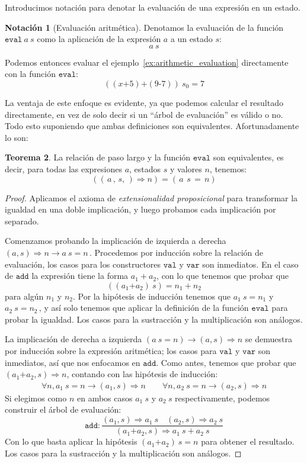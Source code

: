 \documentclass[
  a4paper, 
  10pt, 
  parskip=half, 
  toc=bibliography,
]{scrbook}
\theoremstyle{definition}
\theoremstyle{bolddef}
\newtheorem{theorem}{Teorema}[section]
\newtheorem{notation}[theorem]{Notación}
\newcommand{\funfont}[1]{\texttt{#1}}
\renewcommand{\implies}{\rightarrow}
\newcommand{\ImpPlus}{\mathbin{\texttt{+}}}
\newcommand{\ImpMinus}{\mathbin{\texttt{-}}}
\newcommand{\bigstep}{\Longrightarrow}
\begin{document}
Introducimos notación para denotar la evaluación de una expresión en un
estado.
\begin{notation}[Evaluación aritmética]
  Denotamos la evaluación de la función \(\funfont{eval} \ a \ s\) como la aplicación de la expresión \(a\)
  a un estado \(s\):
  \[
  a \ s
  \]
\end{notation}

Podemos entonces evaluar el ejemplo~\ref{ex:arithmetic_evaluation} directamente
con la función \(\funfont{eval}\):
\[
  ((x \ImpPlus 5) \ImpPlus (9 \ImpMinus 7)) \ s_0 = 7
\]

La ventaja de este enfoque es evidente, ya que podemos calcular el resultado
directamente, en vez de solo decir si un \enquote{árbol de evaluación} es válido o no.
Todo esto suponiendo que ambas definiciones son equivalentes. Afortunadamente lo son:
\begin{theorem}
  La relación de paso largo y la función \(\funfont{eval}\) son equivalentes, es decir, para todas
  las expresiones \(a\), estados \(s\) y valores \(n\), tenemos:
  \[
  ((\, a \,,\, s,\,) \bigstep n) = (\,a \, \ s \,=\, n)
  \]
\end{theorem}

\begin{proof}
Aplicamos el axioma de \emph{extensionalidad proposicional} para transformar la
igualdad en una doble implicación, y luego probamos cada implicación por separado.

Comenzamos probando la implicación de izquierda a derecha
\((a, s) \bigstep n \implies a \ s = n\, \). Procedemos por inducción
sobre la relación de evaluación, los casos para los constructores \(\funfont{val}\)
y \(\funfont{var}\) son inmediatos. En el caso de \(\funfont{add}\) la
expresión tiene la forma \(a_1 + a_2\), con lo que tenemos que probar que
\[
((a_1 \ImpPlus a_2) \ s) = n_1 + n_2
\]
para algún \(n_1\) y \(n_2\). Por la hipótesis de inducción tenemos que
\(a_1 \ s = n_1\) y \(a_2 \ s = n_2\, \), y así solo tenemos que aplicar la
definición de la función \(\funfont{eval}\) para probar la igualdad.
Los casos para la sustracción y la multiplicación son análogos.

La implicación de derecha a izquierda \((a \ s = n) \implies (a, s) \bigstep n\)
se demuestra por inducción sobre la expresión aritmética; los casos para
\(\funfont{val}\) y \(\funfont{var}\) son inmediatos, así que nos enfocamos en
\(\funfont{add}\). Como antes, tenemos que probar que
\((a_1 \ImpPlus a_2, s) \bigstep n\), contando con las hipótesis de inducción:
\[
\begin{gathered}
  \forall n, a_1 \ s = n \implies (a_1, s) \bigstep n \qquad
  \forall n, a_2 \ s = n \implies (a_2, s) \bigstep n
\end{gathered}
\]
Si elegimos como \(n\) en ambos casos \(a_1 \ s\) y \(a_2 \ s\) respectivamente, podemos 
construir el árbol de evaluación:
\[
  \funfont{add}: \frac{
    (a_1, s) \bigstep a_1 \ s
    \quad
    (a_2, s) \bigstep a_2 \ s
  }
  {
   (a_1 \ImpPlus a_2, s) \bigstep a_1 \ s + a_2 \ s
  }
\]
Con lo que basta aplicar la hipótesis \((a_1 \ImpPlus a_2) \ s = n\) para obtener el resultado. Los casos para
la sustracción y la multiplicación son análogos.
\end{proof}
\end{document}
